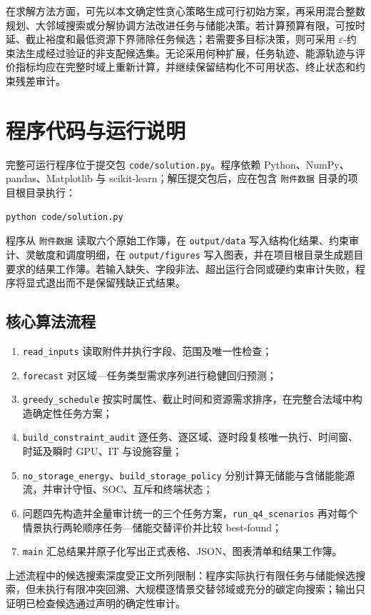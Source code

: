 \documentclass[withoutpreface,bwprint]{cumcmthesis}
\begin{document}
在求解方法方面，可先以本文确定性贪心策略生成可行初始方案，再采用混合整数规划、大邻域搜索或分解协调方法改进任务与储能决策。若计算预算有限，可按时延、截止裕度和最低资源下界筛除任务候选；若需要多目标决策，则可采用 $\varepsilon$-约束法生成经过验证的非支配候选集\cite{miettinen1999nonlinear}。无论采用何种扩展，任务轨迹、能源轨迹与评价指标均应在完整时域上重新计算，并继续保留结构化不可用状态、终止状态和约束残差审计。

\appendix
\section{程序代码与运行说明}

完整可运行程序位于提交包 \texttt{code/solution.py}。程序依赖 Python、NumPy、pandas、Matplotlib 与 scikit-learn；解压提交包后，应在包含 \texttt{附件数据} 目录的项目根目录执行：
\begin{verbatim}
python code/solution.py
\end{verbatim}
程序从 \texttt{附件数据} 读取六个原始工作簿，在 \texttt{output/data} 写入结构化结果、约束审计、灵敏度和调度明细，在 \texttt{output/figures} 写入图表，并在项目根目录生成题目要求的结果工作簿。若输入缺失、字段非法、超出运行合同或硬约束审计失败，程序将显式退出而不是保留残缺正式结果。

\subsection{核心算法流程}
\begin{enumerate}
\item \texttt{read\_inputs} 读取附件并执行字段、范围及唯一性检查；
\item \texttt{forecast} 对区域—任务类型需求序列进行稳健回归预测；
\item \texttt{greedy\_schedule} 按实时属性、截止时间和资源需求排序，在完整合法域中构造确定性任务方案；
\item \texttt{build\_constraint\_audit} 逐任务、逐区域、逐时段复核唯一执行、时间窗、时延及瞬时 GPU、IT 与设施容量；
\item \texttt{no\_storage\_energy}、\texttt{build\_storage\_policy} 分别计算无储能与含储能能源流，并审计守恒、SOC、互斥和终端状态；
\item 问题四先构造并全量审计统一的三个任务方案，\texttt{run\_q4\_scenarios} 再对每个情景执行两轮顺序任务—储能交替评价并比较 best-found；
\item \texttt{main} 汇总结果并原子化写出正式表格、JSON、图表清单和结果工作簿。
\end{enumerate}

上述流程中的候选搜索深度受正文所列限制：程序实际执行有限任务与储能候选搜索，但未执行有限冲突回溯、大规模逐情景交替邻域或充分的碳定向搜索；输出只证明已检查候选通过声明的确定性审计。



\end{document}
